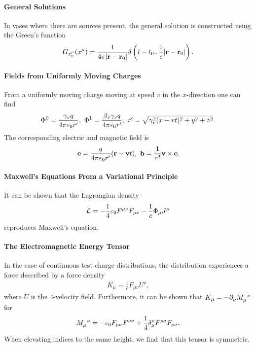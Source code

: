 \paragraph{General Solutions}
In vases where there are sources present, the general solution is constructed using the Green's function
\begin{align*}
	G_{x_{0}^{\mu}}(x^{\mu}) = \frac{1}{4\pi\abs{\vb{r} - \vb{r}_{0}}}\delta\left(t - t_{0 - }\frac{1}{c}\abs{\vb{r} - \vb{r}_{0}}\right).
\end{align*}

\paragraph{Fields from Uniformly Moving Charges}
From a uniformly moving charge moving at speed $v$ in the $x$-direction one can find
\begin{align*}
	\Phi^{0} = \frac{\gamma_{v}q}{4\pi\varepsilon_{0}r^{\prime}},\ \Phi^{1} = \frac{\beta_{v}\gamma_{v}q}{4\pi\varepsilon_{0}r^{\prime}},\ r^{\prime} = \sqrt{\gamma_{v}^{2}(x - vt)^{2} + y^{2} + z^{2}}.
\end{align*}
The corresponding electric and magnetic field is
\begin{align*}
	\vb{e} = \frac{q}{4\pi\varepsilon_{0}r^{\prime}}(\vb{r} - \vb{v}t),\ \vb{b} = \frac{1}{c^{2}}\vb{v}\times\vb{e}.
\end{align*}

\paragraph{Maxwell's Equations From a Variational Principle}
It can be shown that the Lagrangian density
\begin{align*}
	\mathcal{L} = -\frac{1}{4}\varepsilon_{0}F^{\mu\nu}F_{\mu\nu} - \frac{1}{c}\Phi_{\mu}J^{\mu}
\end{align*}
reproduces Maxwell's equation.

\paragraph{The Electromagnetic Energy Tensor}
In the case of continuous test charge distributions, the distribution experiences a force described by a force density
\begin{align*}
	K_{\mu} = \frac{1}{c}F_{\mu\nu}U^{\nu},
\end{align*}
where $U$ is the $4$-velocity field. Furthermore, it can be shown that $K_{\mu} = -\del{\nu}{\tensor{M}{_{\mu}^{\nu}}}$ for
\begin{align*}
	\tensor{M}{_{\mu}^{\nu}} = -\varepsilon_{0}F_{\mu\sigma}F^{\nu\sigma} + \frac{1}{4}\kdelta{\nu}{\mu}F^{\rho\sigma}F_{\rho\sigma}.
\end{align*}
When elevating indices to the same height, we find that this tensor is symmetric.